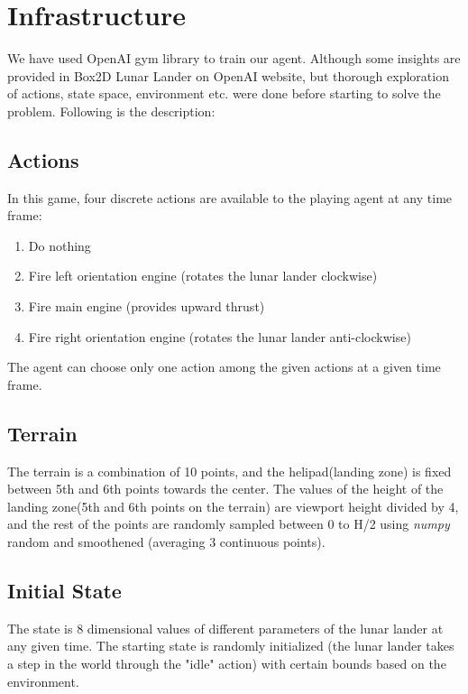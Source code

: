 \section{Infrastructure}
\label{sec:rel}
We have used OpenAI gym library to train our agent. Although some insights are provided in Box2D Lunar Lander on OpenAI website, but thorough exploration of actions, state space, environment etc. were done before starting to solve the problem. Following is the description:

\subsection{Actions}
In this game, four discrete actions are available to the playing agent at any time frame: 

\begin{enumerate}[label=(\alph*)]
\item Do nothing
\item Fire left orientation engine (rotates the lunar lander clockwise)
\item Fire main engine (provides upward thrust)
\item Fire right orientation engine (rotates the lunar lander anti-clockwise)
\end{enumerate}

The agent can choose only one action among the given actions at a given time frame.

\subsection{Terrain} 
The terrain is a combination of 10 points, and the helipad(landing zone) is fixed between 5th and 6th points towards the center. The values of the height of the landing zone(5th and 6th points on the terrain) are viewport height divided by 4, and the rest of the points are randomly sampled between 0 to H/2 using \textit{numpy} random and smoothened (averaging 3 continuous points).

\subsection{Initial State}

The state is 8 dimensional values of different parameters of the lunar lander at any given time. The starting state is randomly initialized (the lunar lander takes a step in the world through the "idle" action) with certain bounds based on the environment.

